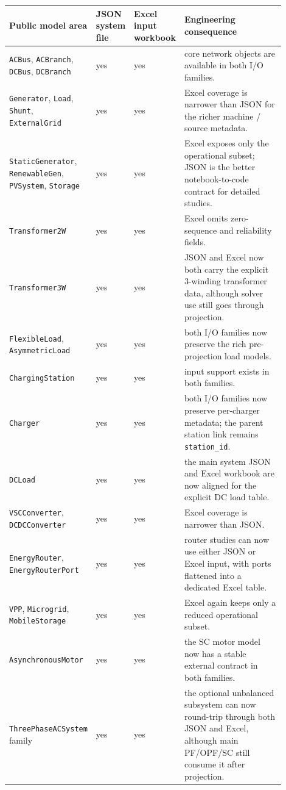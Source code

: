 \begin{longtable}{L{0.24\linewidth}L{0.12\linewidth}L{0.12\linewidth}L{0.42\linewidth}}
\toprule
Public model area & JSON system file & Excel input workbook & Engineering consequence \\
\midrule
\endhead
\texttt{ACBus}, \texttt{ACBranch}, \texttt{DCBus}, \texttt{DCBranch} & yes & yes & core network objects are available in both I/O families. \\
\texttt{Generator}, \texttt{Load}, \texttt{Shunt}, \texttt{ExternalGrid} & yes & yes & Excel coverage is narrower than JSON for the richer machine / source metadata. \\
\texttt{StaticGenerator}, \texttt{RenewableGen}, \texttt{PVSystem}, \texttt{Storage} & yes & yes & Excel exposes only the operational subset; JSON is the better notebook-to-code contract for detailed studies. \\
\texttt{Transformer2W} & yes & yes & Excel omits zero-sequence and reliability fields. \\
\texttt{Transformer3W} & yes & yes & JSON and Excel now both carry the explicit 3-winding transformer data, although solver use still goes through projection. \\
\texttt{FlexibleLoad}, \texttt{AsymmetricLoad} & yes & yes & both I/O families now preserve the rich pre-projection load models. \\
\texttt{ChargingStation} & yes & yes & input support exists in both families. \\
\texttt{Charger} & yes & yes & both I/O families now preserve per-charger metadata; the parent station link remains \texttt{station\_id}. \\
\texttt{DCLoad} & yes & yes & the main system JSON and Excel workbook are now aligned for the explicit DC load table. \\
\texttt{VSCConverter}, \texttt{DCDCConverter} & yes & yes & Excel coverage is narrower than JSON. \\
\texttt{EnergyRouter}, \texttt{EnergyRouterPort} & yes & yes & router studies can now use either JSON or Excel input, with ports flattened into a dedicated Excel table. \\
\texttt{VPP}, \texttt{Microgrid}, \texttt{MobileStorage} & yes & yes & Excel again keeps only a reduced operational subset. \\
\texttt{AsynchronousMotor} & yes & yes & the SC motor model now has a stable external contract in both families. \\
\texttt{ThreePhaseACSystem} family & yes & yes & the optional unbalanced subsystem can now round-trip through both JSON and Excel, although main PF/OPF/SC still consume it after projection. \\
\bottomrule
\end{longtable}

